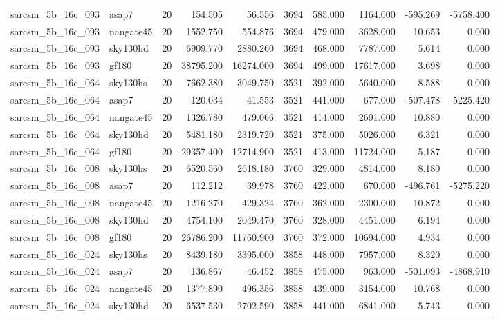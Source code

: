 \documentclass{article}
\begin{document}
\begin{longtable}{llrrrrrrrr}
sarcsm\_5b\_16c\_093 & asap7 & 20 & 154.505 & 56.556 & 3694 & 585.000 & 1164.000 & -595.269 & -5758.400 \\
sarcsm\_5b\_16c\_093 & nangate45 & 20 & 1552.750 & 554.876 & 3694 & 479.000 & 3628.000 & 10.653 & 0.000 \\
sarcsm\_5b\_16c\_093 & sky130hd & 20 & 6909.770 & 2880.260 & 3694 & 468.000 & 7787.000 & 5.614 & 0.000 \\
sarcsm\_5b\_16c\_093 & gf180 & 20 & 38795.200 & 16274.000 & 3694 & 499.000 & 17617.000 & 3.698 & 0.000 \\
sarcsm\_5b\_16c\_064 & sky130hs & 20 & 7662.380 & 3049.750 & 3521 & 392.000 & 5640.000 & 8.588 & 0.000 \\
sarcsm\_5b\_16c\_064 & asap7 & 20 & 120.034 & 41.553 & 3521 & 441.000 & 677.000 & -507.478 & -5225.420 \\
sarcsm\_5b\_16c\_064 & nangate45 & 20 & 1326.780 & 479.066 & 3521 & 414.000 & 2691.000 & 10.880 & 0.000 \\
sarcsm\_5b\_16c\_064 & sky130hd & 20 & 5481.180 & 2319.720 & 3521 & 375.000 & 5026.000 & 6.321 & 0.000 \\
sarcsm\_5b\_16c\_064 & gf180 & 20 & 29357.400 & 12714.900 & 3521 & 413.000 & 11724.000 & 5.187 & 0.000 \\
sarcsm\_5b\_16c\_008 & sky130hs & 20 & 6520.560 & 2618.180 & 3760 & 329.000 & 4814.000 & 8.180 & 0.000 \\
sarcsm\_5b\_16c\_008 & asap7 & 20 & 112.212 & 39.978 & 3760 & 422.000 & 670.000 & -496.761 & -5275.220 \\
sarcsm\_5b\_16c\_008 & nangate45 & 20 & 1216.270 & 429.324 & 3760 & 362.000 & 2300.000 & 10.872 & 0.000 \\
sarcsm\_5b\_16c\_008 & sky130hd & 20 & 4754.100 & 2049.470 & 3760 & 328.000 & 4451.000 & 6.194 & 0.000 \\
sarcsm\_5b\_16c\_008 & gf180 & 20 & 26786.200 & 11760.900 & 3760 & 372.000 & 10694.000 & 4.934 & 0.000 \\
sarcsm\_5b\_16c\_024 & sky130hs & 20 & 8439.180 & 3395.000 & 3858 & 448.000 & 7957.000 & 8.320 & 0.000 \\
sarcsm\_5b\_16c\_024 & asap7 & 20 & 136.867 & 46.452 & 3858 & 475.000 & 963.000 & -501.093 & -4868.910 \\
sarcsm\_5b\_16c\_024 & nangate45 & 20 & 1377.890 & 496.356 & 3858 & 439.000 & 3154.000 & 10.768 & 0.000 \\
sarcsm\_5b\_16c\_024 & sky130hd & 20 & 6537.530 & 2702.590 & 3858 & 441.000 & 6841.000 & 5.743 & 0.000 \\

\end{longtable}
\end{document}
